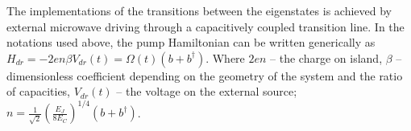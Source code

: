 \documentclass[%
 aip,
 amsmath,amssymb,
 reprint,%
]{revtex4-1}
\begin{document}
 The implementations of the transitions between the eigenstates is achieved by external microwave driving through a capacitively coupled transition line. In the notations used above, the pump Hamiltonian can be written generically as $ 	H_{dr} = -2e n\beta V_{dr}(t)=\Omega(t)(b+b^{\dagger})$.
 Where $2en$ -- the charge on island, $\beta$ -- dimensionless coefficient depending on the geometry of the system and the ratio of capacities, $V_{dr}(t)$ -- the voltage on the external source; $n =\frac{1}{\sqrt{2}} (\frac{E_J}{8E_C})^{1/4}(b+b^{\dagger})$.

\end{document}
